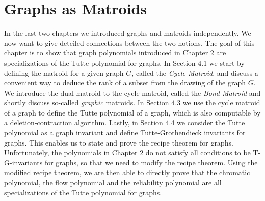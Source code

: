 \documentclass[12pt,a4paper, twoside, autooneside=false]{scrartcl}
\theoremstyle{definition}
\theoremstyle{remark}
\numberwithin{equation}{section}
\begin{document}
\section{Graphs as Matroids}
In the last two chapters we introduced graphs and matroids independently. We now want to give deteiled connections between the two notions. The goal of this chapter is to show that graph polynomials introduced in Chapter 2 are specializations of the Tutte polynomial for graphs. In Section 4.1 we start by defining the matroid for a given graph $G$, called the \textit{Cycle Matroid}, and discuss a convenient way to deduce the rank of a subset from the drawing of the graph $G$. We introduce the dual matroid to the cycle matroid, called the \textit{Bond Matroid} and shortly discuss so-called \textit{graphic} matroids. In Section 4.3 we use the cycle matroid of a graph to define the Tutte polynomial of a graph, which is also computable by a deletion-contraction algorithm. Lastly, in Section 4.4 we consider the Tutte polynomial as a graph invariant and define Tutte-Grothendieck invariants for graphs. This enables us to state and prove the recipe theorem for graphs. Unfortunately, the polynomials in Chapter 2 do not satisfy all conditions to be T-G-invariants for graphs, so that we need to modify the recipe theorem. Using the modified recipe theorem, we are then able to directly prove that the chromatic polynomial, the flow polynomial and the reliability polynomial are all specializations of the Tutte polynomial for graphs. 
\end{document}
